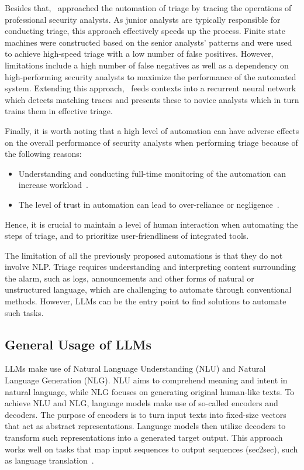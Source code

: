 Besides that,\ \citet{zhong2018learning} approached the automation of triage by tracing the operations of professional
security analysts.
As junior analysts are typically responsible for conducting triage, this approach effectively speeds up the process.
Finite state machines were constructed based on the senior analysts' patterns and were used to achieve high-speed triage
with a low number of false positives.
However, limitations include a high number of false negatives as well as a dependency on high-performing security
analysts to maximize the performance of the automated system.
Extending this approach,\ \citet{lin2018data} feeds contexts into a recurrent neural network which detects matching
traces and presents these to novice analysts which in turn trains them in effective triage.

Finally, it is worth noting that a high level of automation can have adverse effects on the overall performance of
security analysts when performing triage because of the following reasons:
\begin{itemize}
    \item Understanding and conducting full-time monitoring of the automation can increase
    workload\ \citep{kaber2004effects}.
    \item The level of trust in automation can lead to over-reliance or negligence\ \citep{lee2004trust}.
\end{itemize}
Hence, it is crucial to maintain a level of human interaction when automating the steps of triage, and to prioritize
user-friendliness of integrated tools.

The limitation of all the previously proposed automations is that they do not involve NLP\@.
Triage requires understanding and interpreting content surrounding the alarm, such as logs, announcements and other
forms of natural or unstructured language, which are challenging to automate through conventional methods.
However, LLMs can be the entry point to find solutions to automate such tasks.

\subsection{General Usage of LLMs}
\label{subsec:rq1-use-of-llms}

LLMs make use of Natural Language Understanding (NLU) and Natural Language Generation (NLG).
NLU aims to comprehend meaning and intent in natural language, while NLG focuses on generating original human-like
texts.
To achieve NLU and NLG, language models make use of so-called encoders and decoders.
The purpose of encoders is to turn input texts into fixed-size vectors that act as abstract representations.
Language models then utilize decoders to transform such representations into a generated target output.
This approach works well on tasks that map input sequences to output sequences (sec2sec), such as language
translation\ \citep{sutskever2014sequence, cho2014learning}.

